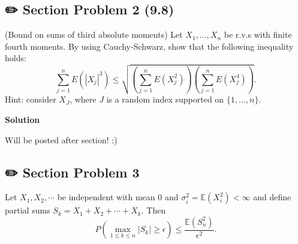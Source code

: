 \documentclass[
  letterpaper,
  DIV=11,
  numbers=noendperiod]{scrreprt}
\newcommand{\E}{\mathbb{E}}
\theoremstyle{plain}
\theoremstyle{definition}
\theoremstyle{remark}
\begin{document}
\hypertarget{section-problem-2-9.8}{%
\subsection*{✏️ Section Problem 2 (9.8)}\label{section-problem-2-9.8}}

(Bound on sums of third absolute moments) Let \(X_{1} ,\dotsc ,X_{n}\)
be r.v.s with finite fourth moments. By using Cauchy-Schwarz, show that
the following inequality holds: \begin{equation*}
\sum _{j=1}^{n} E(|X_{j} |^{3} )\leq \sqrt{\left(\sum _{j=1}^{n} E(X_{j}^{2} )\right)\left(\sum _{j=1}^{n} E(X_{j}^{4} )\right)} .
\end{equation*} Hint: consider \(X_{J}\), where \(J\) is a random index
supported on \(\{1,\dotsc ,n\}\).

\begin{tcolorbox}[enhanced jigsaw, breakable, colback=white, opacityback=0, bottomrule=.15mm, colframe=quarto-callout-tip-color-frame, arc=.35mm, leftrule=.75mm, left=2mm, rightrule=.15mm, toprule=.15mm]
\begin{minipage}[t]{5.5mm}
\textcolor{quarto-callout-tip-color}{\faLightbulb}
\end{minipage}%
\begin{minipage}[t]{\textwidth - 5.5mm}

\textbf{Solution}\vspace{2mm}

Will be posted after section! :)

\end{minipage}%
\end{tcolorbox}

\hypertarget{section-problem-3-5}{%
\subsection*{✏️ Section Problem 3}\label{section-problem-3-5}}

Let \(X_1,X_2,\cdots\) be independent with mean 0 and
\(\sigma^2_i = \E\left(X_i^2\right) < \infty\) and define partial sums
\(S_k = X_1 + X_2 + \cdots + X_k.\) Then \begin{equation}
P\left( \max_{1\leq k \leq n} |S_k| \geq \epsilon \right) \leq \frac{\E\left(S_n^2\right)}{\epsilon^2}. 
\end{equation}
\end{document}
